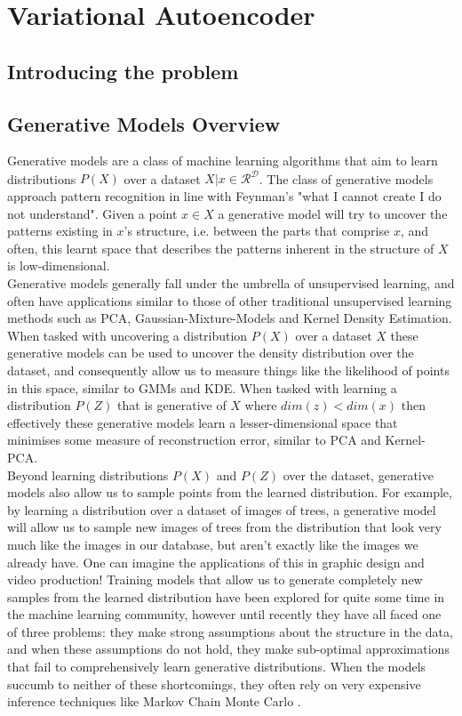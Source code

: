 \chapter{Variational Autoencoder} \label{genmod}
\section{Introducing the problem}



\section{Generative Models Overview}

Generative models are a class of machine learning algorithms that aim to learn distributions $P(X)$ over a dataset $X | x \in \mathcal{R}^\mathcal{D}$. The class of generative models approach pattern recognition in line with Feynman's "what I cannot create I do not understand". Given a point $x \in X$ a generative model will try to uncover the patterns existing in $x$'s structure, i.e. between the parts that comprise $x$, and often, this learnt space that describes the patterns inherent in the structure of $X$ is low-dimensional.\\

Generative models generally fall under the umbrella of unsupervised learning, and often have applications similar to those of other traditional unsupervised learning methods such as PCA, Gaussian-Mixture-Models and Kernel Density Estimation. When tasked with uncovering a distribution $P(X)$ over a dataset $X$ these generative models can be used to uncover the density distribution over the dataset, and consequently allow us to measure things like the likelihood of points in this space, similar to GMMs and KDE. When tasked with learning a distribution $P(Z)$ that is generative of $X$ where $dim(z) < dim(x)$ then effectively these generative models learn a lesser-dimensional space that minimises some measure of reconstruction error, similar to PCA and Kernel-PCA.\\

Beyond learning distributions $P(X)$ and $P(Z)$ over the dataset, generative models also allow us to sample points from the learned distribution. For example, by learning a distribution over a dataset of images of trees, a generative model will allow us to sample new images of trees from the distribution that look very much like the images in our database, but aren't exactly like the images we already have. One can imagine the applications of this in graphic design and video production! Training models that allow us to generate completely new samples from the learned distribution have been explored for quite some time in the machine learning community, however until recently they have all faced one of three problems: they make strong assumptions about the structure in the data, and when these assumptions do not hold, they make sub-optimal approximations that fail to comprehensively learn generative distributions. When the models succumb to neither of these shortcomings, they often rely on very expensive inference techniques like Markov Chain Monte Carlo \citep{doersch2016tutorial}.\\

